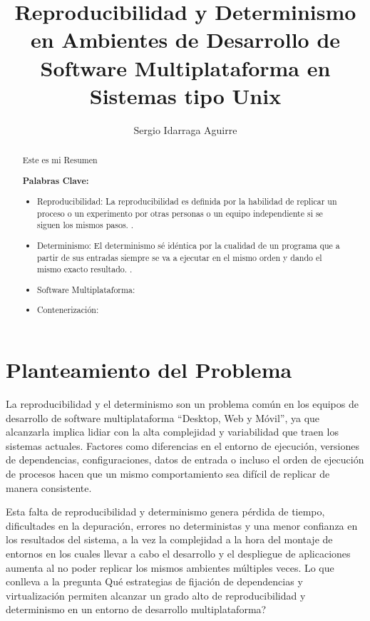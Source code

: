 \documentclass[stu,]{apa7} %
\title{Reproducibilidad y Determinismo en Ambientes de Desarrollo de Software Multiplataforma en Sistemas tipo Unix}
\author{Sergio Idarraga Aguirre}
\affiliation{Corporación Universitaria Remington}
\begin{document}
\maketitle

\begin{abstract}

Este es mi Resumen


\noindent\textbf{Palabras Clave:}
\begin{itemize}
  \item Reproducibilidad: La reproducibilidad es definida por la habilidad de replicar un proceso o un experimento por otras personas o un equipo independiente si se siguen los mismos pasos. \cite{Cordeiro2025}. 

\item Determinismo: El determinismo sé idéntica por la cualidad de un programa que a partir de sus entradas siempre se va a ejecutar en el mismo orden y dando el mismo exacto resultado. \cite{Segulja2020}.

  \item Software Multiplataforma:
  \item  Contenerización:
\end{itemize}
\end{abstract}

\tableofcontents

\listoftables

\listoffigures


\section{Planteamiento del Problema}
La reproducibilidad y el determinismo son un problema común en los equipos de desarrollo de software multiplataforma \enquote{Desktop, Web y Móvil}, ya que alcanzarla implica lidiar con la alta complejidad y variabilidad que traen los sistemas actuales. Factores como diferencias en el entorno de ejecución, versiones de dependencias, configuraciones, datos de entrada o incluso el orden de ejecución de procesos hacen que un mismo comportamiento sea difícil de replicar de manera consistente. 

Esta falta de reproducibilidad y determinismo genera pérdida de tiempo, dificultades en la depuración, errores no deterministas y una menor confianza en los resultados del sistema, a la vez la complejidad a la hora del montaje de entornos en los cuales llevar a cabo el desarrollo y el despliegue de aplicaciones aumenta al no poder replicar los mismos ambientes múltiples veces. Lo que conlleva a la pregunta  \textquestiondown Qué estrategias de fijación de dependencias y virtualización permiten alcanzar un grado alto de reproducibilidad y determinismo en un entorno de desarrollo multiplataforma?
\end{document}
